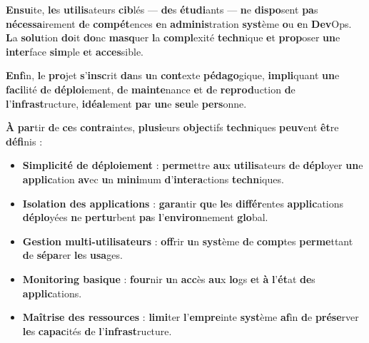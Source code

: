 \documentclass{rapportClass} %
\begin{document}
\textbf{Ensu}ite, \textbf{le}s \textbf{utilis}ateurs \textbf{cib}lés — \textbf{de}s \textbf{étudi}ants — \textbf{n}e \textbf{dispo}sent \textbf{pa}s
\textbf{nécessa}irement \textbf{d}e \textbf{compét}ences \textbf{e}n \textbf{adminis}tration \textbf{syst}ème \textbf{o}u \textbf{e}n \textbf{Dev}Ops.
\textbf{L}a \textbf{solu}tion \textbf{do}it \textbf{do}nc \textbf{masq}uer \textbf{l}a \textbf{compl}exité \textbf{techn}ique \textbf{e}t \textbf{prop}oser \textbf{un}e
\textbf{inter}face \textbf{sim}ple \textbf{e}t \textbf{acces}sible.

\textbf{Enf}in, \textbf{l}e \textbf{pro}jet \textbf{s}’\textbf{insc}rit \textbf{da}ns \textbf{u}n \textbf{cont}exte \textbf{pédago}gique, \textbf{impli}quant \textbf{un}e
\textbf{faci}lité \textbf{d}e \textbf{déploi}ement, \textbf{d}e \textbf{mainte}nance \textbf{e}t \textbf{d}e \textbf{reprod}uction \textbf{d}e
\textbf{l}’\textbf{infrast}ructure, \textbf{idéal}ement \textbf{pa}r \textbf{un}e \textbf{seu}le \textbf{pers}onne.

\textbf{À} \textbf{par}tir \textbf{d}e \textbf{ce}s \textbf{contra}intes, \textbf{plusi}eurs \textbf{objec}tifs \textbf{techn}iques \textbf{peuv}ent
\textbf{êt}re \textbf{défi}nis :

\begin{itemize}
\item \textbf{\textbf{Simpl}icité \textbf{d}e \textbf{déploi}ement} : \textbf{perme}ttre \textbf{au}x \textbf{utilis}ateurs \textbf{d}e
\textbf{dépl}oyer \textbf{un}e \textbf{applic}ation \textbf{av}ec \textbf{u}n \textbf{mini}mum \textbf{d}’\textbf{intera}ctions \textbf{techn}iques.
\item \textbf{\textbf{Isola}tion \textbf{de}s \textbf{applic}ations} : \textbf{gara}ntir \textbf{qu}e \textbf{le}s \textbf{différ}entes
\textbf{applic}ations \textbf{déplo}yées \textbf{n}e \textbf{pertu}rbent \textbf{pa}s \textbf{l}’\textbf{environ}nement \textbf{glo}bal.
\item \textbf{\textbf{Gest}ion \textbf{mul}ti-\textbf{utilis}ateurs} : \textbf{off}rir \textbf{u}n \textbf{syst}ème \textbf{d}e \textbf{comp}tes
\textbf{perme}ttant \textbf{d}e \textbf{sépa}rer \textbf{le}s \textbf{usa}ges.
\item \textbf{\textbf{Monit}oring \textbf{basi}que} : \textbf{four}nir \textbf{u}n \textbf{acc}ès \textbf{au}x \textbf{lo}gs \textbf{e}t \textbf{à}
\textbf{l}’\textbf{ét}at \textbf{de}s \textbf{applic}ations.
\item \textbf{\textbf{Maît}rise \textbf{de}s \textbf{resso}urces} : \textbf{limi}ter \textbf{l}’\textbf{empre}inte \textbf{syst}ème
\textbf{af}in \textbf{d}e \textbf{prése}rver \textbf{le}s \textbf{capac}ités \textbf{d}e \textbf{l}’\textbf{infrast}ructure.
\end{itemize}
\end{document}
